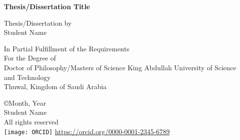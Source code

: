 \documentclass[onecolumn, 12 pt, doublespace, fullpage, a4paper]{report}
\newcommand{\orcid}{\texttt{[image: ORCID]}} %
\begin{document}

\thispagestyle{empty}
\addvspace{5mm}  %


\begin{center}
\begin{doublespace}
{\textbf{{\large Thesis/Dissertation Title}}}%
\end{doublespace}

\vspace{10mm}
{Thesis/Dissertation by}\\
{Student Name} %

\vspace{30mm}

{ In Partial Fulfillment of the Requirements}\\[12pt]
{ For the Degree of}\\[12pt]
{Doctor of Philosophy/Masters of Science} \vfill
{King Abdullah University of Science and Technology }\\
{Thuwal, Kingdom of Saudi Arabia}
\vfill


\begin{onehalfspace}
{\copyright Month, Year}\\
Student Name\\               %
All rights reserved\\

\orcid{} \small \href{https://orcid.org/0000-0001-2345-6789}{https://orcid.org/0000-0001-2345-6789}\\
\end{onehalfspace}

\end{center}
\newpage




\end{document}
